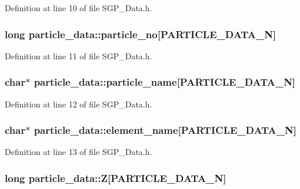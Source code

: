 Definition at line 10 of file SGP\_\-Data.h.\hypertarget{structparticle__data_eed610bc58086737e01a79647b19d9d9}{
\subsubsection[particle\_\-no]{\setlength{\rightskip}{0pt plus 5cm}long {\bf particle\_\-data::particle\_\-no}\mbox{[}PARTICLE\_\-DATA\_\-N\mbox{]}}}
\label{d6/dac/structparticle__data_eed610bc58086737e01a79647b19d9d9}




Definition at line 11 of file SGP\_\-Data.h.\hypertarget{structparticle__data_0ebe80869d03628d77c855fbc574dcd4}{
\subsubsection[particle\_\-name]{\setlength{\rightskip}{0pt plus 5cm}char$\ast$ {\bf particle\_\-data::particle\_\-name}\mbox{[}PARTICLE\_\-DATA\_\-N\mbox{]}}}
\label{d6/dac/structparticle__data_0ebe80869d03628d77c855fbc574dcd4}




Definition at line 12 of file SGP\_\-Data.h.\hypertarget{structparticle__data_7567c2bf554d06d27fc80685da9f4da1}{
\subsubsection[element\_\-name]{\setlength{\rightskip}{0pt plus 5cm}char$\ast$ {\bf particle\_\-data::element\_\-name}\mbox{[}PARTICLE\_\-DATA\_\-N\mbox{]}}}
\label{d6/dac/structparticle__data_7567c2bf554d06d27fc80685da9f4da1}




Definition at line 13 of file SGP\_\-Data.h.\hypertarget{structparticle__data_6388499656a78568105f86cfdfffddaa}{
\subsubsection[Z]{\setlength{\rightskip}{0pt plus 5cm}long {\bf particle\_\-data::Z}\mbox{[}PARTICLE\_\-DATA\_\-N\mbox{]}}}
\label{d6/dac/structparticle__data_6388499656a78568105f86cfdfffddaa}




